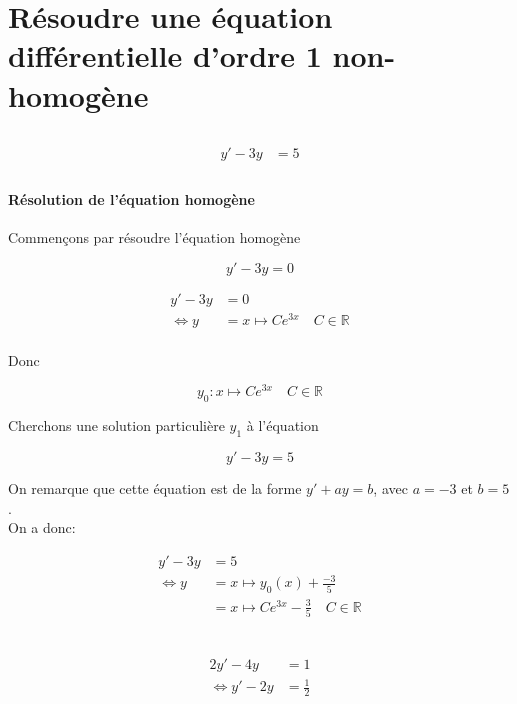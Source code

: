 \documentclass{article}
\newcommand{\R}{\mathds{R}}
\begin{document}
\section{Résoudre une équation différentielle d'ordre 1 non-homogène}
\subsection{}

\begin{align*}
	y'-3y&= 5 \\
\end{align*}

\paragraph{Résolution de l'équation homogène}
Commençons par résoudre l'équation homogène

\[
	y' - 3y = 0
\] 

\begin{align*}
	y' - 3y &= 0 \\
	\iff y &= x \mapsto Ce^{3x} \quad C \in \R\\
\end{align*}

Donc 

\[
	y_0 : x \mapsto Ce^{3x}\quad C \in \R
\] 

Cherchons une solution particulière $y_1$ à l'équation 

\[
	y' - 3y = 5
\] 

On remarque que cette équation est de la forme $y' + ay = b$, avec $a = -3$ et $b = 5$. \\
On a donc:

\begin{align*}
	y' - 3y &= 5 \\
	\iff y &= x \mapsto y_0(x) + \frac{-3}{5} \\
            &= x \mapsto Ce^{3x} - \frac{3}{5} \quad C \in \R \\
\end{align*}

\subsection{}

\begin{align}
	2y'-4y&= 1 \\ \nonumber
	\iff y' - 2y &= \frac{1}{2}
\end{align}
\end{document}
